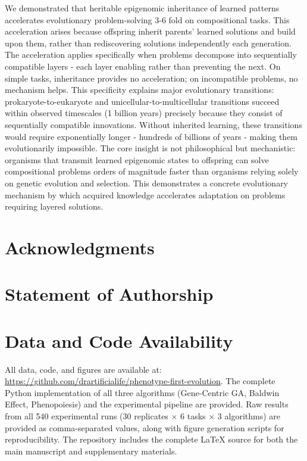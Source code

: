 \documentclass[11pt]{article}
\begin{document}
We demonstrated that heritable epigenomic inheritance of learned patterns accelerates evolutionary problem-solving 3-6 fold on compositional tasks. This acceleration arises because offspring inherit parents' learned solutions and build upon them, rather than rediscovering solutions independently each generation. The acceleration applies specifically when problems decompose into sequentially compatible layers - each layer enabling rather than preventing the next. On simple tasks, inheritance provides no acceleration; on incompatible problems, no mechanism helps. This specificity explains major evolutionary transitions: prokaryote-to-eukaryote and unicellular-to-multicellular transitions succeed within observed timescales (1 billion years) precisely because they consist of sequentially compatible innovations. Without inherited learning, these transitions would require exponentially longer - hundreds of billions of years - making them evolutionarily impossible. The core insight is not philosophical but mechanistic: organisms that transmit learned epigenomic states to offspring can solve compositional problems orders of magnitude faster than organisms relying solely on genetic evolution and selection. This demonstrates a concrete evolutionary mechanism by which acquired knowledge accelerates adaptation on problems requiring layered solutions.

\section*{Acknowledgments}


\section*{Statement of Authorship}


\section*{Data and Code Availability}

All data, code, and figures are available at: \url{https://github.com/drartificialife/phenotype-first-evolution}. The complete Python implementation of all three algorithms (Gene-Centric GA, Baldwin Effect, Phenopoiesis) and the experimental pipeline are provided. Raw results from all 540 experimental runs (30 replicates $\times$ 6 tasks $\times$ 3 algorithms) are provided as comma-separated values, along with figure generation scripts for reproducibility. The repository includes the complete LaTeX source for both the main manuscript and supplementary materials.
\end{document}
